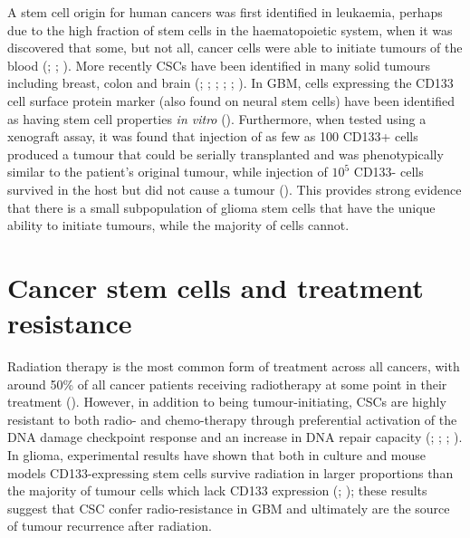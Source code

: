 \documentclass[
  letterpaper,
]{scrreprt}
\theoremstyle{definition}
\theoremstyle{remark}
\begin{document}
A stem cell origin for human cancers was first identified in leukaemia,
perhaps due to the high fraction of stem cells in the haematopoietic
system, when it was discovered that some, but not all, cancer cells were
able to initiate tumours of the blood
(;
;
). More recently CSCs
have been identified in many solid tumours including breast, colon and
brain (;
;
;
;
;
). In GBM, cells expressing
the CD133 cell surface protein marker (also found on neural stem cells)
have been identified as having stem cell properties \emph{in vitro}
(). Furthermore, when tested
using a xenograft assay, it was found that injection of as few as 100
CD133+ cells produced a tumour that could be serially transplanted and
was phenotypically similar to the patient's original tumour, while
injection of \(10^5\) CD133- cells survived in the host but did not
cause a tumour (). This
provides strong evidence that there is a small subpopulation of glioma
stem cells that have the unique ability to initiate tumours, while the
majority of cells cannot.

\section{Cancer stem cells and treatment
resistance}\label{sec-cancer-stem-cells-and-treatment-resistance}

Radiation therapy is the most common form of treatment across all
cancers, with around 50\% of all cancer patients receiving radiotherapy
at some point in their treatment (). However, in addition to being tumour-initiating, CSCs are
highly resistant to both radio- and chemo-therapy through preferential
activation of the DNA damage checkpoint response and an increase in DNA
repair capacity (;
; ; ). In glioma,
experimental results have shown that both in culture and mouse models
CD133-expressing stem cells survive radiation in larger proportions than
the majority of tumour cells which lack CD133 expression
(; ); these results suggest that CSC confer radio-resistance in
GBM and ultimately are the source of tumour recurrence after radiation.
\end{document}

